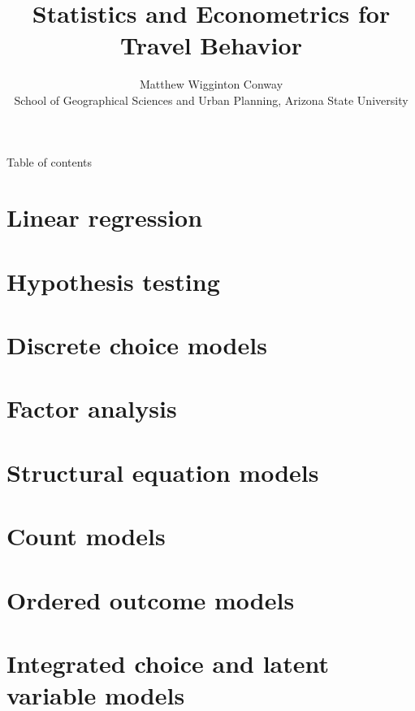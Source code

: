 \documentclass[aspectratio=169]{beamer}
\title{Statistics and Econometrics for Travel Behavior}
\author{Matthew Wigginton Conway\\School of Geographical Sciences and Urban Planning, Arizona State University}
\begin{document}
\maketitle

\begin{frame}{Table of contents}
  \tableofcontents
\end{frame}

\section{Linear regression}



\section{Hypothesis testing}


\section{Discrete choice models}


\section{Factor analysis}



\section{Structural equation models}



\section{Count models}


\section{Ordered outcome models}


\section{Integrated choice and latent variable models}

%

\begin{frame}[allowframebreaks]
  \printbibliography
\end{frame}


\end{document}
